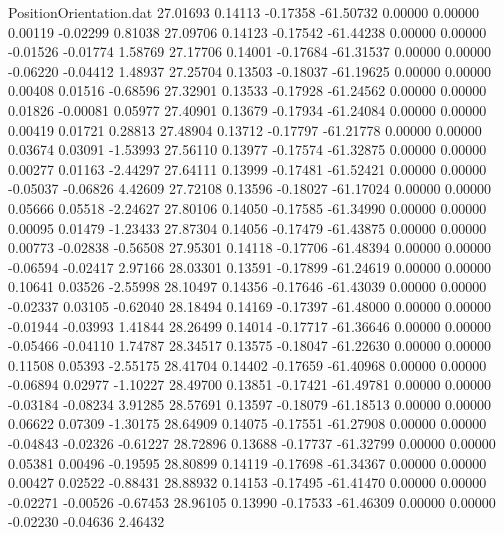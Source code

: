 \begin{filecontents}{PositionOrientation.dat}
  27.01693    0.14113   -0.17358   -61.50732    0.00000    0.00000    0.00119   -0.02299    0.81038
  27.09706    0.14123   -0.17542   -61.44238    0.00000    0.00000   -0.01526   -0.01774    1.58769
  27.17706    0.14001   -0.17684   -61.31537    0.00000    0.00000   -0.06220   -0.04412    1.48937
  27.25704    0.13503   -0.18037   -61.19625    0.00000    0.00000    0.00408    0.01516   -0.68596
  27.32901    0.13533   -0.17928   -61.24562    0.00000    0.00000    0.01826   -0.00081    0.05977
  27.40901    0.13679   -0.17934   -61.24084    0.00000    0.00000    0.00419    0.01721    0.28813
  27.48904    0.13712   -0.17797   -61.21778    0.00000    0.00000    0.03674    0.03091   -1.53993
  27.56110    0.13977   -0.17574   -61.32875    0.00000    0.00000    0.00277    0.01163   -2.44297
  27.64111    0.13999   -0.17481   -61.52421    0.00000    0.00000   -0.05037   -0.06826    4.42609
  27.72108    0.13596   -0.18027   -61.17024    0.00000    0.00000    0.05666    0.05518   -2.24627
  27.80106    0.14050   -0.17585   -61.34990    0.00000    0.00000    0.00095    0.01479   -1.23433
  27.87304    0.14056   -0.17479   -61.43875    0.00000    0.00000    0.00773   -0.02838   -0.56508
  27.95301    0.14118   -0.17706   -61.48394    0.00000    0.00000   -0.06594   -0.02417    2.97166
  28.03301    0.13591   -0.17899   -61.24619    0.00000    0.00000    0.10641    0.03526   -2.55998
  28.10497    0.14356   -0.17646   -61.43039    0.00000    0.00000   -0.02337    0.03105   -0.62040
  28.18494    0.14169   -0.17397   -61.48000    0.00000    0.00000   -0.01944   -0.03993    1.41844
  28.26499    0.14014   -0.17717   -61.36646    0.00000    0.00000   -0.05466   -0.04110    1.74787
  28.34517    0.13575   -0.18047   -61.22630    0.00000    0.00000    0.11508    0.05393   -2.55175
  28.41704    0.14402   -0.17659   -61.40968    0.00000    0.00000   -0.06894    0.02977   -1.10227
  28.49700    0.13851   -0.17421   -61.49781    0.00000    0.00000   -0.03184   -0.08234    3.91285
  28.57691    0.13597   -0.18079   -61.18513    0.00000    0.00000    0.06622    0.07309   -1.30175
  28.64909    0.14075   -0.17551   -61.27908    0.00000    0.00000   -0.04843   -0.02326   -0.61227
  28.72896    0.13688   -0.17737   -61.32799    0.00000    0.00000    0.05381    0.00496   -0.19595
  28.80899    0.14119   -0.17698   -61.34367    0.00000    0.00000    0.00427    0.02522   -0.88431
  28.88932    0.14153   -0.17495   -61.41470    0.00000    0.00000   -0.02271   -0.00526   -0.67453
  28.96105    0.13990   -0.17533   -61.46309    0.00000    0.00000   -0.02230   -0.04636    2.46432

\end{filecontents}
